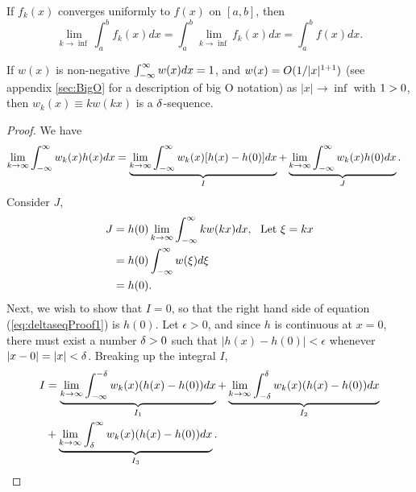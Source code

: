 \begin{theorem}
    If \(f_k(x)\) converges uniformly to \(f(x)\) on \([a,b]\), then
    \begin{equation*}
        \lim_{k\to\inf} \int_{a}^{b}f_k(x) dx = \int_{a}^{b} \lim_{k\to\inf}  f_k(x)dx = \int_{a}^{b} f(x) dx.
    \end{equation*}
\end{theorem}

\begin{theorem}\label{th:assertion}
    If \(w(x)\) is non-negative \(\int_{-\infty}^{\infty} w(x) dx = 1\), and \(w(x)=O(1/|x|^{1+1})\) (see appendix \ref{sec:BigO} for a description of big O notation) as \(|x| \rightarrow \inf\) with \(1>0\), then \( w_k(x) \equiv kw(kx)\) is a \(\delta\)-sequence.
\end{theorem}
\begin{proof}    
    We have
    \begin{equation}\label{eq:deltaseqProof1}
        \begin{split}
            \lim_{k\rightarrow \infty}\int_{-\infty}^{\infty} w_k(x)h(x) dx &= \underbrace{\lim_{k\rightarrow\infty} \int_{-\infty}^{\infty} w_k(x)[h(x)-h(0)]dx}_I+ \underbrace{\lim_{k\rightarrow\infty} \int_{-\infty}^{\infty} w_k(x)h(0)dx}_J.
        \end{split}
    \end{equation}
    Consider \(J\),
    \begin{equation}
        \begin{split}
            J &= h(0) \lim_{k\rightarrow\inf} \intR kw(kx)dx, \ \ \text{Let  }\xi =kx\\
            &=h(0)\intR w(\xi) d\xi\\
            &= h(0).
        \end{split}
    \end{equation}
    Next, we wish to show that \(I=0\), so that the right hand side of equation (\ref{eq:deltaseqProof1}) is \(h(0)\). Let \(\epsilon > 0\), and since \(h\) is continuous at \(x=0\), there must exist a number \(\delta>0\) such that \(|h(x)-h(0)|<\epsilon\) whenever \(|x-0|=|x|<\delta\). Breaking up the integral \(I\),
    \begin{equation}
        \begin{split}
            I &= \underbrace{\lim_{k\rightarrow \inf} \int_{-\inf}^{-\d} w_k(x)(h(x)-h(0)) dx}_{I_1} + \underbrace{\lim_{k\rightarrow \inf} \int_{-\d}^{\d} w_k(x)(h(x)-h(0)) dx}_{I_2} \\ & + \underbrace{\lim_{k\rightarrow \inf} \int_{\d}^{\inf} w_k(x)(h(x)-h(0)) dx}_{I_3}.\\

\end{split}
\end{equation}
\end{proof}
